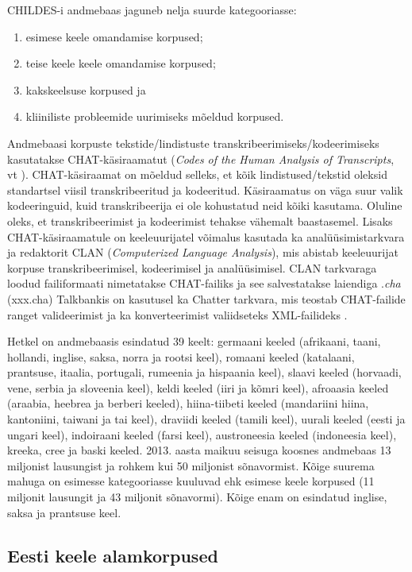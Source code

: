 \documentclass[12pt]{article}
\begin{document}
CHILDES-i andmebaas jaguneb nelja suurde kategooriasse:
\begin{enumerate}
    \item esimese keele omandamise korpused;
    \item teise keele keele omandamise korpused;
    \item kakskeelsuse korpused ja 
    \item kliiniliste probleemide uurimiseks mõeldud korpused. \citep[1]{Gillis}
\end{enumerate}

Andmebaasi korpuste tekstide/lindistuste transkribeerimiseks/kodeerimiseks kasutatakse CHAT-käsiraamatut (\emph{Codes of the Human Analysis of Transcripts}, vt \citep{CHAT}). CHAT-käsiraamat on mõeldud selleks, et kõik lindistused/tekstid oleksid standartsel viisil transkribeeritud ja kodeeritud. Käsiraamatus on väga suur valik kodeeringuid, kuid transkribeerija ei ole kohustatud neid kõiki kasutama. Oluline oleks, et transkribeerimist ja kodeerimist tehakse vähemalt baastasemel. Lisaks CHAT-käsiraamatule on keeleuurijatel võimalus kasutada ka analüüsimistarkvara ja redaktorit CLAN (\emph{Computerized Language Analysis}), mis abistab keeleuurijat korpuse transkribeerimisel, kodeerimisel ja analüüsimisel. CLAN tarkvaraga loodud failiformaati nimetatakse CHAT-failiks ja see salvestatakse laiendiga .\emph{cha} (xxx.cha) \citep[1--2, 6]{Gillis} Talkbankis on kasutusel ka Chatter tarkvara, mis teostab CHAT-failide ranget valideerimist ja ka konverteerimist valiidseteks XML-failideks \citep{CHATTER}.

Hetkel on andmebaasis esindatud 39 keelt: germaani keeled (afrikaani, taani, hollandi, inglise, saksa, norra ja rootsi keel), romaani keeled (katalaani, prantsuse, itaalia, portugali, rumeenia ja hispaania keel), slaavi keeled (horvaadi, vene, serbia ja sloveenia keel), keldi keeled (iiri ja kõmri keel), afroaasia keeled (araabia, heebrea ja berberi keeled), hiina-tiibeti keeled (mandariini hiina, kantoniini, taiwani ja tai keel), draviidi keeled (tamili keel), uurali keeled (eesti ja ungari keel), indoiraani keeled (farsi keel), austroneesia keeled (indoneesia keel), kreeka, cree ja baski keeled. 2013. aasta maikuu seisuga koosnes andmebaas 13 miljonist lausungist ja rohkem kui 50 miljonist sõnavormist. Kõige suurema mahuga on esimesse kategooriasse kuuluvad ehk esimese keele korpused (11 miljonit lausungit ja 43 miljonit sõnavormi). Kõige enam on esindatud inglise, saksa ja prantsuse keel.\citep[2--5]{Gillis}

\subsection{Eesti keele alamkorpused}
\end{document}
